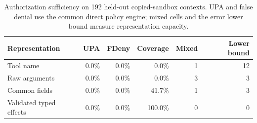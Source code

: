 \begin{table}[t]
\centering
\small
\caption{Authorization sufficiency on 192 held-out copied-sandbox contexts. UPA and false denial use the common direct policy engine; mixed cells and the error lower bound measure representation capacity.}
\label{tab:full-deployment-authz}
\begin{tabular}{lrrrrr}
\toprule
Representation & UPA & FDeny & Coverage & Mixed & Lower bound \\
\midrule
Tool name & 0.0\% & 0.0\% & 0.0\% & 1 & 12 \\
Raw arguments & 0.0\% & 0.0\% & 0.0\% & 3 & 3 \\
Common fields & 0.0\% & 0.0\% & 41.7\% & 1 & 3 \\
Validated typed effects & 0.0\% & 0.0\% & 100.0\% & 0 & 0 \\
\bottomrule
\end{tabular}
\end{table}
